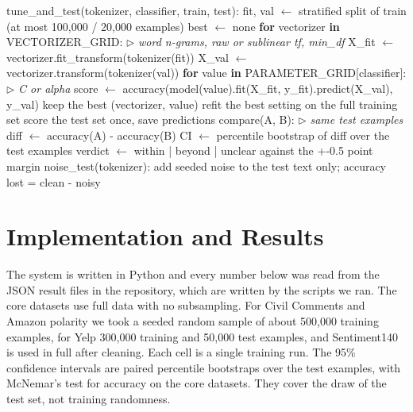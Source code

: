 \documentclass{ieeeaccess}
\begin{document}
\begin{algorithm}[!tb]
\scriptsize
\caption{Tuning, paired comparison and noise test}\label{alg:6}
\begin{algorithmic}[1]
\State tune\_and\_test(tokenizer, classifier, train, test):
\State \hspace*{1.0em}fit, val $\leftarrow$ stratified split of train (at most 100,000 / 20,000 examples)
\State \hspace*{1.0em}best $\leftarrow$ none
\State \hspace*{1.0em}\textbf{for} vectorizer \textbf{in} VECTORIZER\_GRID: \hfill{\scriptsize$\triangleright$ \textit{word n-grams, raw or sublinear tf, min\_df}}
\State \hspace*{2.0em}X\_fit $\leftarrow$ vectorizer.fit\_transform(tokenizer(fit))
\State \hspace*{2.0em}X\_val $\leftarrow$ vectorizer.transform(tokenizer(val))
\State \hspace*{2.0em}\textbf{for} value \textbf{in} PARAMETER\_GRID[classifier]: \hfill{\scriptsize$\triangleright$ \textit{C or alpha}}
\State \hspace*{3.0em}score $\leftarrow$ accuracy(model(value).fit(X\_fit, y\_fit).predict(X\_val), y\_val)
\State \hspace*{3.0em}keep the best (vectorizer, value)
\State \hspace*{1.0em}refit the best setting on the full training set
\State \hspace*{1.0em}score the test set once, save predictions
\Statex {}
\State compare(A, B): \hfill{\scriptsize$\triangleright$ \textit{same test examples}}
\State \hspace*{1.0em}diff $\leftarrow$ accuracy(A) - accuracy(B)
\State \hspace*{1.0em}CI   $\leftarrow$ percentile bootstrap of diff over the test examples
\State \hspace*{1.0em}verdict $\leftarrow$ within | beyond | unclear   against the +-0.5 point margin
\State noise\_test(tokenizer): add seeded noise to the test text only; accuracy lost = clean - noisy
\end{algorithmic}
\end{algorithm}

\section{Implementation and Results}\label{sec:4}
The system is written in Python and every number below was read from the JSON result files in the repository, which are written by the scripts we ran. The core datasets use full data with no subsampling. For Civil Comments and Amazon polarity we took a seeded random sample of about 500,000 training examples, for Yelp 300,000 training and 50,000 test examples, and Sentiment140 is used in full after cleaning. Each cell is a single training run. The 95\% confidence intervals are paired percentile bootstraps over the test examples, with McNemar's test for accuracy on the core datasets. They cover the draw of the test set, not training randomness.
\end{document}
